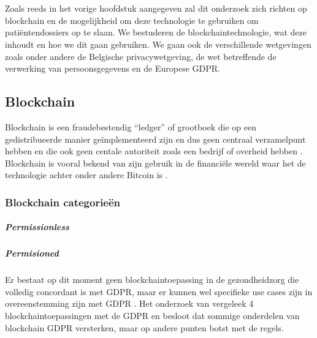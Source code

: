\chapter{}
\label{ch:stand-van-zaken}

Zoals reeds in het vorige hoofdstuk aangegeven zal dit onderzoek zich richten op blockchain en de mogelijkheid om deze technologie te gebruiken om patiëntendossiers op te slaan. We bestuderen de blockchaintechnologie, wat deze inhoudt en hoe we dit gaan gebruiken. We gaan ook de verschillende wetgevingen zoals onder andere de Belgische privacywetgeving, de wet betreffende de verwerking van persoonsgegevens en de Europese GDPR.
\section{Blockchain}
\label{ch:blockchain}

Blockchain is een fraudebestendig ``ledger'' of grootboek die op een gedistribueerde manier geïmplementeerd zijn en dus geen centraal verzamelpunt hebben en die ook geen centale autoriteit zoals een bedrijf of overheid hebben \autocite{Yaga2018}. Blockchain is vooral bekend van zijn gebruik in de financiële wereld waar het de technologie achter onder andere Bitcoin is \autocite{Nofer2017}. 

\subsection{Blockchain categorieën}

\paragraph{Permissionless}

\paragraph{Permisioned}

Er bestaat op dit moment geen blockchaintoepassing in de gezondheidzorg die volledig concordant is met GDPR, maar er kunnen wel specifieke use cases zijn in overeenstemming zijn met GDPR \autocite{Hasselgren2020}. Het onderzoek van \textcite{Hasselgren2020} vergeleek 4 blockchaintoepassingen met de GDPR en besloot dat sommige onderdelen van blockchain GDPR versterken, maar op andere punten botst met de regels.

